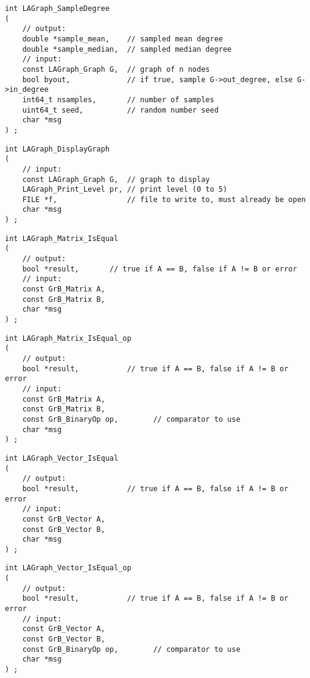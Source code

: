 \begin{verbatim}
int LAGraph_SampleDegree
(
    // output:
    double *sample_mean,    // sampled mean degree
    double *sample_median,  // sampled median degree
    // input:
    const LAGraph_Graph G,  // graph of n nodes
    bool byout,             // if true, sample G->out_degree, else G->in_degree
    int64_t nsamples,       // number of samples
    uint64_t seed,          // random number seed
    char *msg
) ;
\end{verbatim}




\begin{verbatim}
int LAGraph_DisplayGraph
(
    // input:
    const LAGraph_Graph G,  // graph to display
    LAGraph_Print_Level pr, // print level (0 to 5)
    FILE *f,                // file to write to, must already be open
    char *msg
) ;
\end{verbatim}




\begin{verbatim}
int LAGraph_Matrix_IsEqual
(
    // output:
    bool *result,       // true if A == B, false if A != B or error
    // input:
    const GrB_Matrix A,
    const GrB_Matrix B,
    char *msg
) ;
\end{verbatim}




\begin{verbatim}
int LAGraph_Matrix_IsEqual_op
(
    // output:
    bool *result,           // true if A == B, false if A != B or error
    // input:
    const GrB_Matrix A,
    const GrB_Matrix B,
    const GrB_BinaryOp op,        // comparator to use
    char *msg
) ;
\end{verbatim}




\begin{verbatim}
int LAGraph_Vector_IsEqual
(
    // output:
    bool *result,           // true if A == B, false if A != B or error
    // input:
    const GrB_Vector A,
    const GrB_Vector B,
    char *msg
) ;
\end{verbatim}




\begin{verbatim}
int LAGraph_Vector_IsEqual_op
(
    // output:
    bool *result,           // true if A == B, false if A != B or error
    // input:
    const GrB_Vector A,
    const GrB_Vector B,
    const GrB_BinaryOp op,        // comparator to use
    char *msg
) ;
\end{verbatim}




